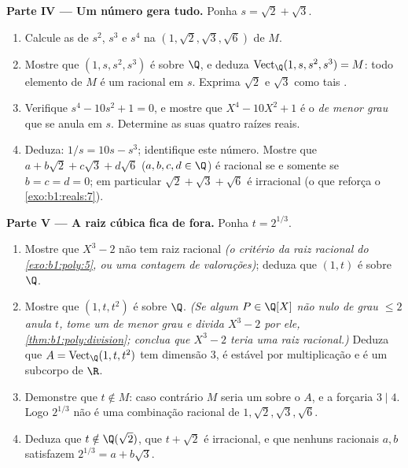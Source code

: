 \begin{problem}
\medskip
\noindent\textbf{Parte IV --- Um número gera tudo.}
Ponha $s = \sqrt2 + \sqrt3$.
\begin{enumerate}[resume]
  \item Calcule as  de $s^2$, $s^3$ e $s^4$ na 
        $(1, \sqrt2, \sqrt3, \sqrt6)$ de $M$.
  \item Mostre que $(1, s, s^2, s^3)$ é  sobre $\Q$, e deduza $\operatorname{Vect}_\Q(1, s, s^2, s^3) = M$: todo
        elemento de $M$ é um  racional em $s$. Exprima
        $\sqrt2$ e $\sqrt3$ como tais .
  \item Verifique $s^4 - 10s^2 + 1 = 0$, e mostre que $X^4 - 10X^2
        + 1$ é o \emph{ de menor grau} que se anula em $s$. Determine as
        suas quatro raízes reais.
  \item Deduza: $1/s = 10s - s^3$; identifique este número. Mostre que $a + b\sqrt2 + c\sqrt3 + d\sqrt6$
        ($a,b,c,d \in \Q$) é racional se e somente se $b = c = d = 0$; em particular
        $\sqrt2 + \sqrt3 + \sqrt6$ é irracional (o que reforça o \cref{exo:b1:reals:7}).
\end{enumerate}

\medskip
\noindent\textbf{Parte V --- A raiz cúbica fica de fora.} Ponha
$t
= 2^{1/3}$.
\begin{enumerate}[resume]
  \item Mostre que $X^3 - 2$ não tem raiz racional \emph{(o
        critério da raiz racional do \cref{exo:b1:poly:5}, ou uma contagem de
        valorações)}; deduza que $(1, t)$ é  sobre $\Q$.
  \item Mostre que $(1, t, t^2)$ é  sobre $\Q$. \emph{(Se algum $P \in \Q[X]$
        não nulo de grau $\leq 2$ anula $t$, tome um de menor grau
        e divida $X^3 - 2$ por ele, \cref{thm:b1:poly:division}; conclua que $X^3 - 2$
        teria uma raiz racional.)} Deduza que $A =
        \operatorname{Vect}_\Q(1, t, t^2)$ tem dimensão
        $3$, é estável por multiplicação e é um subcorpo de $\R$.
  \item Demonstre que $t \notin M$: caso contrário $M$ seria um  sobre o  $A$, e a  forçaria
        $3 \mid 4$. Logo $2^{1/3}$ não é uma combinação racional de
        $1, \sqrt2, \sqrt3, \sqrt6$.
  \item Deduza que $t \notin \Q(\sqrt2)$, que $t + \sqrt2$ é irracional, e que nenhuns
        racionais $a, b$ satisfazem $2^{1/3} = a + b\sqrt3$.
\end{enumerate}


\end{problem}
